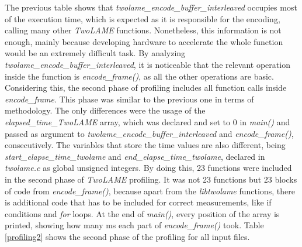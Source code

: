 The previous table shows that \textit{twolame\_encode\_buffer\_interleaved} occupies most of the execution time, which is expected as it is responsible for the encoding, calling many other \textit{TwoLAME} functions. Nonetheless, this information is not enough, mainly because developing hardware to accelerate the whole function would be an extremely difficult task.
By analyzing \textit{twolame\_encode\_buffer\_interleaved}, it is noticeable that the relevant operation inside the function is \textit{encode\_frame()}, as all the other operations are basic.
Considering this, the second phase of profiling includes all function calls inside \textit{encode\_frame}. 
This phase was similar to the previous one in terms of methodology. The only differences were the usage of the \textit{elapsed\_time\_\textit{TwoLAME}} array, which was declared and set to 0 in \textit{main()} and passed as argument to \textit{twolame\_encode\_buffer\_interleaved} and \textit{encode\_frame()}, consecutively. The variables that store the time values are also different, being \textit{start\_elapse\_time\_twolame} and \textit{end\_elapse\_time\_twolame}, declared in \textit{twolame.c} as global unsigned integers.
By doing this, 23 functions were included in the second phase of \textit{TwoLAME} profiling. It was not 23 functions but 23 blocks of code from \textit{encode\_frame()}, because apart from the \textit{libtwolame} functions, there is additional code that has to be included for correct measurements, like if conditions and \textit{for} loops.
At the end of \textit{main()}, every position of the array is printed, showing how many ms each part of \textit{encode\_frame()} took. 
Table \ref{profiling2} shows the second phase of the profiling for all input files.

